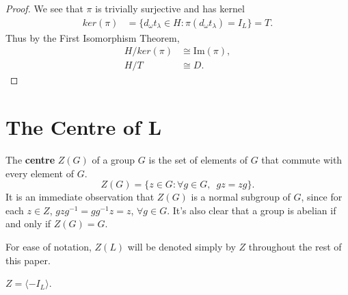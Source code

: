 \begin{proof}
We see that $\pi$ is trivially surjective and has kernel
\begin{align*}  ker(\pi) &= \{ d_\omega t_\lambda \in H : \pi(d_\omega t_\lambda) = I_L \} = T.
\end{align*}
Thus by the First Isomorphism Theorem,
\begin{align*} H / ker(\pi) &\cong \text{Im}(\pi), \\
H / T &\cong D.
\end{align*}

\end{proof}

\section[The Centre of $L$]{The Centre of $\pmb{L}$}

\begin{definition}
The \textbf{centre} $Z(G)$ of a group $G$ is the set of elements of  $G$ that commute with every element of $G$.
\begin {equation*} Z(G) = \{ z \in G : \forall g \in G, \hspace{6pt} gz=zg \}. \end{equation*}
It is an immediate observation that $Z(G)$ is a normal subgroup of $G$, since for each $z \in Z$, $gzg^{-1} = gg^{-1}z = z$, $\forall g \in G$. It's also clear that a group is abelian if and only if $Z(G)=G$.

\end{definition}

For ease of notation, $Z(L)$ will be denoted simply by $Z$ throughout the rest of this paper.

\begin{lemma}\label{6.2}
$Z = \langle - I_L \rangle$.
\end{lemma}

